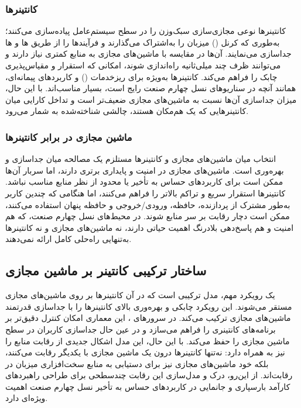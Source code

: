 \subsubsection{کانتینر‌ها}

کانتینرها نوعی مجازی‌سازی سبک‌وزن را در سطح سیستم‌عامل پیاده‌سازی می‌کنند؛ به‌طوری که کرنل () میزبان را به‌اشتراک می‌گذارند و فرآیندها را از طریق ها و ها جداسازی می‌نمایند. آن‌ها در مقایسه با ماشین‌های مجازی به منابع کمتری نیاز دارند و می‌توانند ظرف چند میلی‌ثانیه راه‌اندازی شوند، امکانی که استقرار و مقیاس‌پذیری چابک را فراهم می‌کند. کانتینرها به‌ویژه برای ریزخدمات () و کاربردهای پیمانه‌ای، همانند آنچه در سناریوهای نسل چهارم صنعت رایج است، بسیار مناسب‌اند. با این حال، میزان جداسازی آن‌ها نسبت به ماشین‌های مجازی ضعیف‌تر است و تداخل کارایی میان کانتینرهایی که یک هم‌مکان هستند، چالشی شناخته‌شده به شمار می‌رود.

\subsubsection{ماشین مجازی در برابر کانتینر‌ها}

انتخاب میان ماشین‌های مجازی و کانتینرها مستلزم یک مصالحه میان جداسازی و بهره‌وری است. ماشین‌های مجازی در امنیت و پایداری برتری دارند، اما سربار آن‌ها ممکن است برای کاربردهای حساس به تأخیر یا محدود از نظر منابع مناسب نباشد. کانتینرها استقرار سریع و تراکم بالاتر را فراهم می‌کنند، اما هنگامی که چندین کاربر به‌طور مشترک از پردازنده، حافظه، ورودی/خروجی و حافظه پنهان استفاده می‌کنند، ممکن است دچار رقابت بر سر منابع شوند. در محیط‌های نسل چهارم صنعت، که هم امنیت و هم پاسخ‌دهی بلادرنگ اهمیت حیاتی دارند، نه ماشین‌های مجازی و نه کانتینرها به‌تنهایی راه‌حلی کامل ارائه نمی‌دهند.

\subsection{ساختار ترکیبی کانتینر بر ماشین مجازی}

یک رویکرد مهم، مدل ترکیبی است که در آن کانتینرها بر روی ماشین‌های مجازی مستقر می‌شوند. این رویکرد چابکی و بهره‌وری بالای کانتینرها را با جداسازی قدرتمند ماشین‌های مجازی ترکیب می‌کند. در سرورهای ، این معماری امکان کنترل دقیق‌تر بر برنامه‌های کانتینری را فراهم می‌سازد و در عین حال جداسازی کاربران در سطح ماشین مجازی را حفظ می‌کند. با این حال، این مدل اشکال جدیدی از رقابت منابع را نیز به همراه دارد: نه‌تنها کانتینرها درون یک ماشین مجازی با یکدیگر رقابت می‌کنند، بلکه خود ماشین‌های مجازی نیز برای دستیابی به منابع سخت‌افزاری میزبان  در رقابت‌اند. از این‌رو، درک و مدل‌سازی این رقابت چندسطحی برای طراحی راهبردهای کارآمد بارسپاری و جانمایی در کاربردهای حساس به تأخیر نسل چهارم صنعت اهمیت ویژه‌ای دارد.

